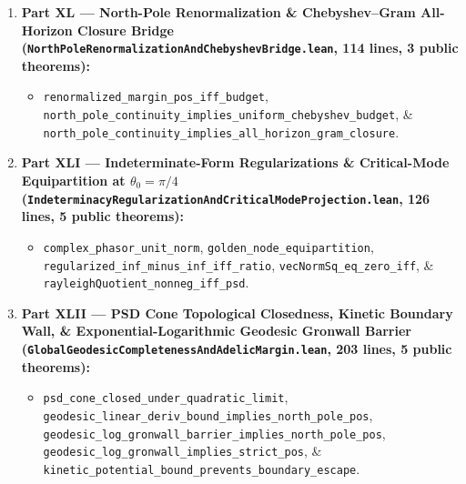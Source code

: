 \documentclass[
  11pt,
]{article}
\providecommand{\tightlist}{%
  \setlength{\itemsep}{0pt}\setlength{\parskip}{0pt}}
\begin{document}
\begin{enumerate}
  \begin{itemize}
  \tightlist
  \item
    \texttt{stereographicHorizon\_mem\_Ioo},
    \texttt{tendsto\_stereographicHorizon\_atTop}, \&
    \texttt{compact\_horizon\_pos\_implies\_uniform\_margin}.
  \end{itemize}
\item
  \textbf{Part XL --- North-Pole Renormalization \& Chebyshev--Gram
  All-Horizon Closure Bridge
  (\texttt{NorthPoleRenormalizationAndChebyshevBridge.lean}, 114 lines,
  3 public theorems):}

  \begin{itemize}
  \tightlist
  \item
    \texttt{renormalized\_margin\_pos\_iff\_budget},
    \texttt{north\_pole\_continuity\_implies\_uniform\_chebyshev\_budget},
    \&
    \texttt{north\_pole\_continuity\_implies\_all\_horizon\_gram\_closure}.
  \end{itemize}
\item
  \textbf{Part XLI --- Indeterminate-Form Regularizations \&
  Critical-Mode Equipartition at \(\theta_0 = \pi/4\)
  (\texttt{IndeterminacyRegularizationAndCriticalModeProjection.lean},
  126 lines, 5 public theorems):}

  \begin{itemize}
  \tightlist
  \item
    \texttt{complex\_phasor\_unit\_norm},
    \texttt{golden\_node\_equipartition},
    \texttt{regularized\_inf\_minus\_inf\_iff\_ratio},
    \texttt{vecNormSq\_eq\_zero\_iff}, \&
    \texttt{rayleighQuotient\_nonneg\_iff\_psd}.
  \end{itemize}
\item
  \textbf{Part XLII --- PSD Cone Topological Closedness, Kinetic
  Boundary Wall, \& Exponential-Logarithmic Geodesic Gronwall Barrier
  (\texttt{GlobalGeodesicCompletenessAndAdelicMargin.lean}, 203 lines, 5
  public theorems):}

  \begin{itemize}
  \tightlist
  \item
    \texttt{psd\_cone\_closed\_under\_quadratic\_limit},
    \texttt{geodesic\_linear\_deriv\_bound\_implies\_north\_pole\_pos},
    \texttt{geodesic\_log\_gronwall\_barrier\_implies\_north\_pole\_pos},
    \texttt{geodesic\_log\_gronwall\_implies\_strict\_pos}, \&
    \texttt{kinetic\_potential\_bound\_prevents\_boundary\_escape}.
  \end{itemize}
\end{enumerate}
\end{document}
